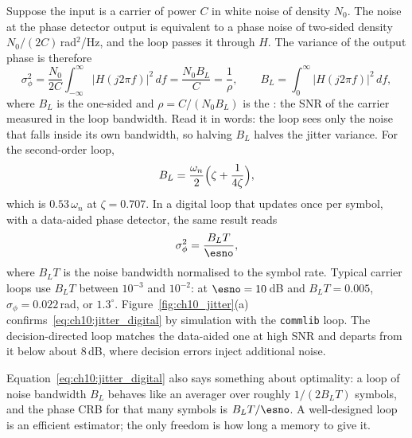Suppose the input is a carrier of power $C$ in white noise of density $N_0$. The noise at the phase
detector output is equivalent to a phase noise of two-sided density $N_0/(2C)$\,rad$^2$/Hz, and the
loop passes it through $H$. The variance of the output phase is therefore
\begin{equation}
\sigma_\phi^2=\frac{N_0}{2C}\int_{-\infty}^{\infty}|H(j2\pi f)|^2\,df=\frac{N_0B_L}{C}=\frac{1}{\rho},
\qquad B_L=\int_0^\infty|H(j2\pi f)|^2\,df,
\label{eq:ch10:jitter}
\end{equation}
where $B_L$ is the one-sided  and $\rho=C/(N_0B_L)$ is the :
the SNR of the carrier measured in the loop bandwidth. Read it in words: the loop sees only the
noise that falls inside its own bandwidth, so halving $B_L$ halves the jitter variance. For the
second-order loop,
\begin{equation}
B_L=\frac{\omega_n}{2}\Bigl(\zeta+\frac{1}{4\zeta}\Bigr),
\label{eq:ch10:BL}
\end{equation}
which is $0.53\,\omega_n$ at $\zeta=0.707$. In a digital loop that updates once per symbol, with a
data-aided phase detector, the same result reads
\begin{equation}
\sigma_\phi^2=\frac{B_LT}{\esno},
\label{eq:ch10:jitter_digital}
\end{equation}
where $B_LT$ is the noise bandwidth normalised to the symbol rate. Typical carrier loops use
$B_LT$ between $10^{-3}$ and $10^{-2}$: at $\esno=10$\,dB and $B_LT=0.005$, $\sigma_\phi=0.022$\,rad,
or $1.3^\circ$. Figure~\ref{fig:ch10_jitter}(a) confirms~\eqref{eq:ch10:jitter_digital} by simulation
with the \texttt{commlib} loop. The decision-directed loop matches the data-aided one at high SNR
and departs from it below about 8\,dB, where decision errors inject additional noise.


Equation~\eqref{eq:ch10:jitter_digital} also says something about optimality: a loop of noise
bandwidth $B_L$ behaves like an averager over roughly $1/(2B_LT)$ symbols, and the phase CRB for that
many symbols is $B_LT/\esno$. A well-designed loop is an efficient estimator; the only freedom is
how long a memory to give it.

